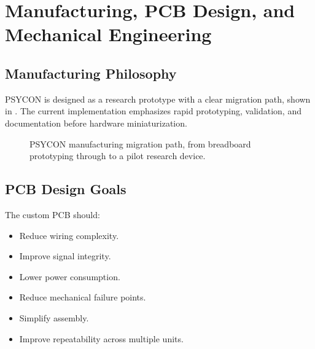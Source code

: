 \section{Manufacturing, PCB Design, and Mechanical Engineering}
\label{sec:manufacturing}

\subsection{Manufacturing Philosophy}
\label{sec:manufacturing-philosophy}

PSYCON is designed as a research prototype with a clear migration path, shown in . The current implementation emphasizes rapid prototyping, validation, and documentation before hardware miniaturization.

\begin{figure}[H]
\centering
{}
\caption{PSYCON manufacturing migration path, from breadboard prototyping through to a pilot research device.}
\label{fig:manufacturing-path}
\end{figure}

\subsection{PCB Design Goals}
\label{sec:pcb-design-goals}

The custom PCB should:
\begin{itemize}
    \item Reduce wiring complexity.
    \item Improve signal integrity.
    \item Lower power consumption.
    \item Reduce mechanical failure points.
    \item Simplify assembly.
    \item Improve repeatability across multiple units.
\end{itemize}

